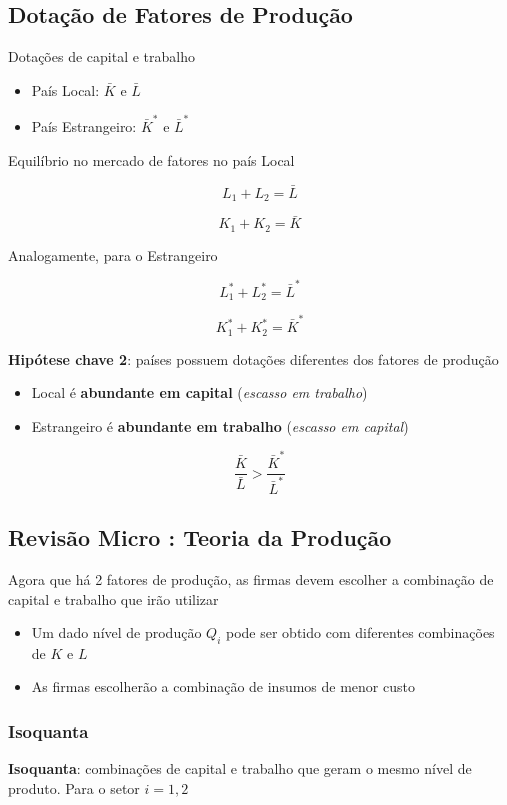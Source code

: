 \documentclass[a4paper,12pt]{article}[abntex2]
\begin{document}
\subsection{\textbf{Dotação de Fatores de Produção}}
Dotações de capital e trabalho\begin{itemize}
    \item País Local: \( \bar{K} \) e \( \bar{L} \)
    \item País Estrangeiro: \( \bar{K}^* \) e \( \bar{L}^* \)
\end{itemize}

Equilíbrio no mercado de fatores no país Local

\[
L_1 + L_2 = \bar{L}
\]

\[
K_1 + K_2 = \bar{K}
\]

Analogamente, para o Estrangeiro

\[
L_1^* + L_2^* = \bar{L}^*
\]

\[
K_1^* + K_2^* = \bar{K}^*
\]

\textbf{Hipótese chave 2}: países possuem dotações diferentes dos fatores de produção

\begin{itemize}
    \item Local é \textbf{abundante em capital} (\textit{escasso em trabalho})
    \item Estrangeiro é \textbf{abundante em trabalho} (\textit{escasso em capital})
\end{itemize}

\[
\frac{\bar{K}}{\bar{L}} > \frac{\bar{K}^*}{\bar{L}^*}
\]

\subsection{\textbf{Revisão Micro : Teoria da Produção}}
Agora que há 2 fatores de produção, as firmas devem escolher a combinação de capital e trabalho que irão utilizar
\begin{itemize}
    \item Um dado nível de produção \( Q_i \) pode ser obtido com diferentes combinações de \( K \) e \( L \)
    \item As firmas escolherão a combinação de insumos de menor custo
\end{itemize}

\subsubsection{\textbf{Isoquanta}}
\textbf{Isoquanta}: combinações de capital e trabalho que geram o mesmo nível de produto. Para o setor \( i = 1,2 \)
\end{document}
